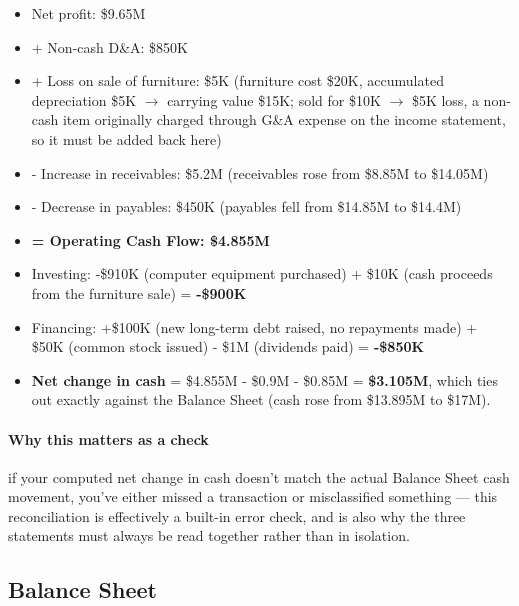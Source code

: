 \documentclass[12pt,openany]{book}
\begin{document}
\begin{itemize}[leftmargin=*]
    \item Net profit: \$9.65M
    \item + Non-cash D\&A: \$850K
    \item + Loss on sale of furniture: \$5K (furniture cost \$20K, accumulated depreciation \$5K \(\to\) carrying value \$15K; sold for \$10K \(\to\) \$5K loss, a non-cash item originally charged through G\&A expense on the income statement, so it must be added back here)
    \item - Increase in receivables: \$5.2M (receivables rose from \$8.85M to \$14.05M)
    \item - Decrease in payables: \$450K (payables fell from \$14.85M to \$14.4M)
    \item \textbf{= Operating Cash Flow: \$4.855M}
\end{itemize}

\begin{itemize}[leftmargin=*]
    \item Investing: -\$910K (computer equipment purchased) + \$10K (cash proceeds from the furniture sale) = \textbf{-\$900K}
    \item Financing: +\$100K (new long-term debt raised, no repayments made) + \$50K (common stock issued) - \$1M (dividends paid) = \textbf{-\$850K}
\end{itemize}

\begin{itemize}[leftmargin=*]
    \item \textbf{Net change in cash} = \$4.855M - \$0.9M - \$0.85M = \textbf{\$3.105M}, which ties out exactly against the Balance Sheet (cash rose from \$13.895M to \$17M).
\end{itemize}

\paragraph{Why this matters as a check} if your computed net change in cash doesn't match the actual Balance Sheet cash movement, you've either missed a transaction or misclassified something --- this reconciliation is effectively a built-in error check, and is also why the three statements must always be read together rather than in isolation.

\subsection{Balance Sheet}
\end{document}
